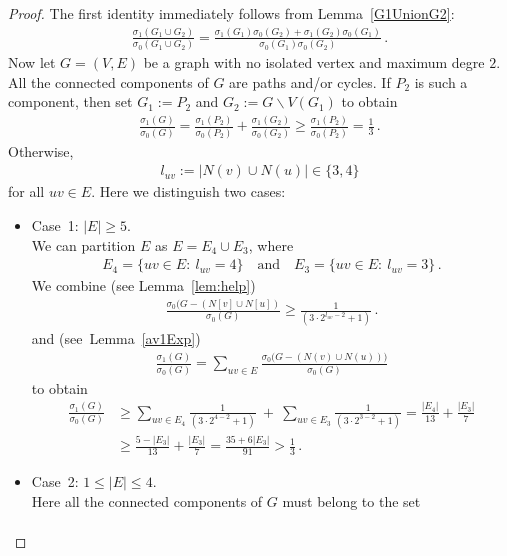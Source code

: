\documentclass[10pt,a4paper]{amsart}
\begin{document}
\begin{proof}
The first identity immediately follows from Lemma~\ref{G1UnionG2}:
\begin{align*}
\frac{ \sigma_1(G_1 \cup G_2)}{ \sigma_0(G_1 \cup G_2)}=\frac{\sigma_1(G_1) \sigma_0(G_2) + \sigma_1(G_2) \sigma_0(G_1)}{\sigma_0(G_1) \sigma_0(G_2)}\,.
\end{align*}
Now let $G=(V,E)$ be a graph with no isolated vertex and maximum degre $2$. All the connected components of $G$ are paths and/or cycles. If $P_2$ is such a component, then set $G_1:=P_2$ and $G_2:=G\backslash V(G_1)$ to obtain
\begin{align*}
\frac{ \sigma_1(G)}{ \sigma_0(G)}=\frac{ \sigma_1(P_2)}{ \sigma_0(P_2)}+\frac{ \sigma_1(G_2)}{ \sigma_0(G_2)}\geq \frac{ \sigma_1(P_2)}{ \sigma_0(P_2)}=\frac{1}{3}\,.
\end{align*}
Otherwise, 
\begin{align*}
l_{uv}:=|N(v)\cup N(u)|\in \{3,4\}
\end{align*}
for all $uv\in E$. Here we distinguish two cases:
\begin{itemize}
\item Case~1: $|E|\geq 5$.\\
We can partition $E$ as $E=E_4 \cup E_3$, where
\begin{align*}
E_4=\{uv\in E:~ l_{uv}=4 \}\quad \text{and} \quad E_3=\{uv\in E:~ l_{uv}=3 \}\,.
\end{align*}
We combine (see Lemma~\ref{lem:help})
\begin{align*}
\frac{\sigma_0(G-(N[v]\cup N[u])}{\sigma_0(G)}\geq \frac{1}{(3\cdot 2^{l_{uv}-2}+1)}\,.
\end{align*}
and (see~Lemma~\ref{av1Exp})
\begin{align*}
\frac{\sigma_1(G)}{\sigma_0(G)}=\sum_{uv \in E} \frac{\sigma_0\big(G-(N(v) \cup N(u))\big)}{\sigma_0(G)}
\end{align*}
to obtain
\begin{align*}
\frac{\sigma_1(G)}{\sigma_0(G)}&\geq \sum_{uv \in E_4} \frac{1}{(3\cdot 2^{4-2}+1)} ~ + ~\sum_{uv \in E_3} \frac{1}{(3\cdot 2^{3-2}+1)}=\frac{|E_4|}{13}+\frac{|E_3|}{7}\\
& \geq \frac{5-|E_3|}{13}+\frac{|E_3|}{7}=\frac{35+6|E_3|}{91}> \frac{1}{3}\,.
\end{align*}
\item Case~2: $1\leq |E|\leq 4$.\\
Here all the connected components of $G$ must belong to the set
\begin{align*}

\end{align*}
\end{itemize}
\end{proof}
\end{document}
